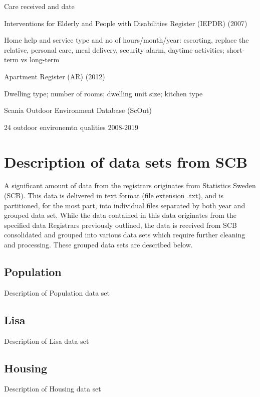\documentclass[
]{book}
\begin{document}
Care received and date

Interventions for Elderly and People with Disabilities Register (IEPDR) (2007)

Home help and service type and no of hours/month/year: escorting, replace the relative, personal care, meal delivery, security alarm, daytime activities; short-term vs long-term

Apartment Register (AR) (2012)

Dwelling type; number of rooms; dwelling unit size; kitchen type

Scania Outdoor Environment Database (ScOut)

24 outdoor environemtn qualities 2008-2019

\hypertarget{description-of-data-sets-from-scb}{%
\chapter{Description of data sets from SCB}\label{description-of-data-sets-from-scb}}

A significant amount of data from the registrars originates from Statistics Sweden (SCB). This data is delivered in text format (file extension .txt), and is partitioned, for the most part, into individual files separated by both year and grouped data set. While the data contained in this data originates from the specified data Registrars previously outlined, the data is received from SCB consolidated and grouped into various data sets which require further cleaning and processing. These grouped data sets are described below.

\hypertarget{population}{%
\section{Population}\label{population}}

Description of Population data set

\hypertarget{lisa}{%
\section{Lisa}\label{lisa}}

Description of Lisa data set

\hypertarget{housing}{%
\section{Housing}\label{housing}}

Description of Housing data set
\end{document}
